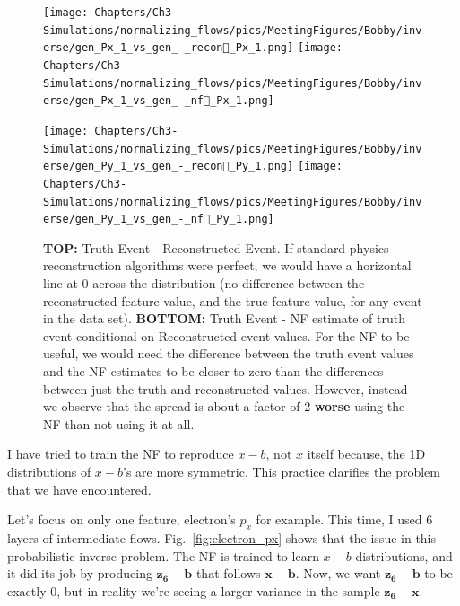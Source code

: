 \begin{figure}[htb]
    \centering
    \begin{minipage}{.5\textwidth}
    
        \centering
        
        \texttt{[image: Chapters/Ch3-Simulations/normalizing\_flows/pics/MeetingFigures/Bobby/inverse/gen\_Px\_1\_vs\_gen\_-\_recon\_Px\_1.png]}
        \texttt{[image: Chapters/Ch3-Simulations/normalizing\_flows/pics/MeetingFigures/Bobby/inverse/gen\_Px\_1\_vs\_gen\_-\_nf\_Px\_1.png]}

    \end{minipage}%
    \begin{minipage}{.5\textwidth}
    
        \centering
        
        \texttt{[image: Chapters/Ch3-Simulations/normalizing\_flows/pics/MeetingFigures/Bobby/inverse/gen\_Py\_1\_vs\_gen\_-\_recon\_Py\_1.png]}
        \texttt{[image: Chapters/Ch3-Simulations/normalizing\_flows/pics/MeetingFigures/Bobby/inverse/gen\_Py\_1\_vs\_gen\_-\_nf\_Py\_1.png]}

    \end{minipage}%
    \caption[Placeholder Short text]{\textbf{TOP:} Truth Event - Reconstructed Event. If standard physics reconstruction algorithms were perfect, we would have a horizontal line at 0 across the distribution (no difference between the reconstructed feature value, and the true feature value, for any event in the data set). \textbf{BOTTOM:} Truth Event - NF estimate of truth event conditional on Reconstructed event values. For the NF to be useful, we would need the difference between the truth event values and the NF estimates to be closer to zero than the differences between just the truth and reconstructed values. However, instead we observe that the spread is about a factor of 2 \textbf{worse} using the NF than not using it at all. }
    \label{fig:16features6}
\end{figure}


I have tried to train the NF to reproduce $x-b$, not $x$ itself because, the 1D distributions of $x-b$'s are more symmetric. This practice clarifies the problem that we have encountered.

Let's focus on only one feature, electron's $p_x$ for example. This time, I used 6 layers of intermediate flows. Fig.~\ref{fig:electron_px} shows that the issue in this probabilistic inverse problem.
The NF is trained to learn $x-b$ distributions, and it did its job by producing $\mathbf{z_6}-\mathbf{b}$ that follows $\mathbf{x}-\mathbf{b}$. Now, we want $\mathbf{z_6}-\mathbf{b}$ to be exactly 0, but in reality we're seeing a larger variance in the sample $\mathbf{z_6}-\mathbf{x}$.

